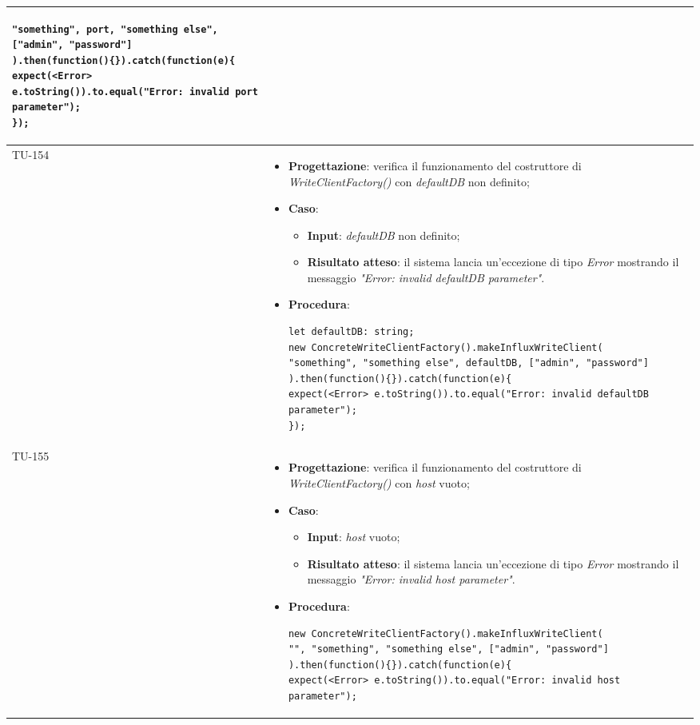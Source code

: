 \begin{longtable}{|C{1.5cm}|C{14.5cm}|}
\begin{itemize}
\begin{lstlisting}
"something", port, "something else", ["admin", "password"]
).then(function(){}).catch(function(e){
expect(<Error> e.toString()).to.equal("Error: invalid port parameter");
});
	\end{lstlisting}
\end{itemize}\\
\hline
{TU-154} &
\begin{itemize}
	\item \textbf{Progettazione}: verifica il funzionamento del costruttore di \emph{WriteClientFactory()} con \emph{defaultDB} non definito;
	\item \textbf{Caso}: 
	\begin{itemize}
		\item \textbf{Input}: \emph{defaultDB} non definito;
		\item \textbf{Risultato atteso}: il sistema lancia un'eccezione di tipo \emph{Error} mostrando il messaggio \emph{"Error: invalid defaultDB parameter"}.
	\end{itemize}
	\item \textbf{Procedura}:
	\begin{lstlisting}
let defaultDB: string;
new ConcreteWriteClientFactory().makeInfluxWriteClient(
"something", "something else", defaultDB, ["admin", "password"]
).then(function(){}).catch(function(e){
expect(<Error> e.toString()).to.equal("Error: invalid defaultDB parameter");
});
	\end{lstlisting}
\end{itemize}\\
\hline
{TU-155} &
\begin{itemize}
	\item \textbf{Progettazione}: verifica il funzionamento del costruttore di \emph{WriteClientFactory()} con \emph{host} vuoto;
	\item \textbf{Caso}: 
	\begin{itemize}
		\item \textbf{Input}: \emph{host} vuoto;
		\item \textbf{Risultato atteso}: il sistema lancia un'eccezione di tipo \emph{Error} mostrando il messaggio \emph{"Error: invalid host parameter"}.
	\end{itemize}
	\item \textbf{Procedura}:
	\begin{lstlisting}
new ConcreteWriteClientFactory().makeInfluxWriteClient(
"", "something", "something else", ["admin", "password"]
).then(function(){}).catch(function(e){
expect(<Error> e.toString()).to.equal("Error: invalid host parameter");

\end{lstlisting}
\end{itemize}
\end{longtable}
